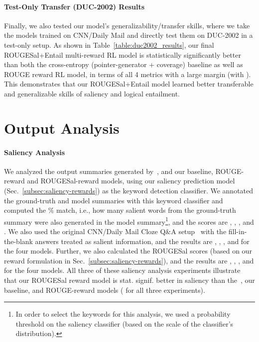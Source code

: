 \documentclass[11pt,a4paper]{article}
\begin{document}
\paragraph{Test-Only Transfer (DUC-2002) Results} 
Finally, we also tested our model's generalizability/transfer skills, where we take the models trained on CNN/Daily Mail and directly test them on DUC-2002 in a test-only setup. As shown in Table~\ref{table:duc2002_results}, our final ROUGESal+Entail multi-reward RL model is statistically significantly better than both the cross-entropy (pointer-generator + coverage) baseline as well as ROUGE reward RL model, in terms of all 4 metrics with a large margin (with ). This demonstrates that our ROUGESal+Entail model learned better transferable and generalizable skills of saliency and logical entailment.








 
\section{Output Analysis}
\label{sec:analysis}

\paragraph{Saliency Analysis} We analyzed the output summaries generated by~, and our baseline, ROUGE-reward and ROUGESal-reward models, using our saliency prediction model (Sec.~\ref{subsec:saliency-rewards}) as the keyword detection classifier. We annotated the ground-truth and model summaries with this keyword classifier and computed the \% match, i.e., how many salient words from the ground-truth summary were also generated in the model summary\footnote{In order to select the keywords for this analysis, we used a  probability threshold on the saliency classifier (based on the scale of the classifier's distribution).}, and the scores are , , , and . We also used the original CNN/Daily Mail Cloze Q\&A setup~\cite{hermann2015teaching} with the fill-in-the-blank answers treated as salient information, and the results are , , , and  for the four models. Further, we also calculated the ROUGESal scores (based on our reward formulation in Sec.~\ref{subsec:saliency-rewards}), and the results are , , , and  for the four models. All three of these saliency analysis experiments illustrate that our ROUGESal reward model is stat. signif. better in saliency than the~, our baseline, and ROUGE-reward models ( for all three experiments).
\end{document}

